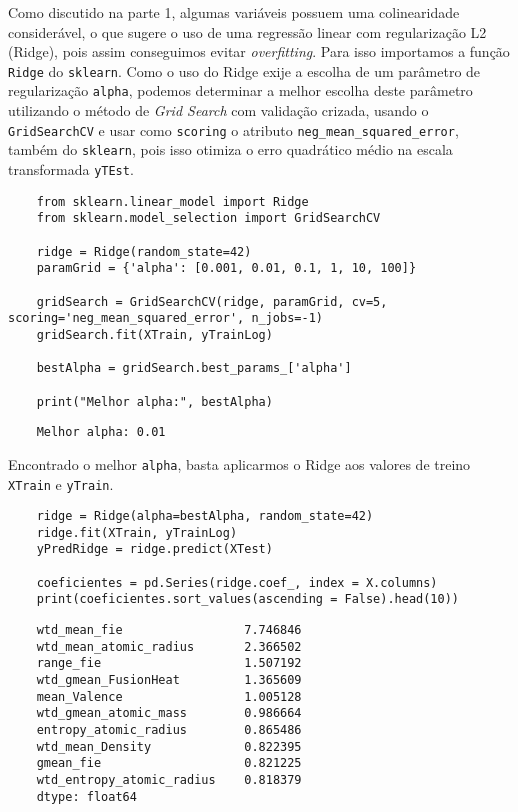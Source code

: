 Como discutido na parte 1, algumas variáveis possuem uma colinearidade considerável, o que sugere o uso de uma regressão linear com regularização L2 (Ridge), pois assim conseguimos evitar \textit{overfitting}. Para isso importamos a função \verb|Ridge| do \verb|sklearn|. Como o uso do Ridge exije a escolha de um parâmetro de regularização \verb|alpha|, podemos determinar a melhor escolha deste parâmetro utilizando o método de \textit{Grid Search} com validação crizada, usando o \verb|GridSearchCV| e usar como \verb|scoring| o atributo \verb|neg_mean_squared_error|, também do \verb|sklearn|, pois isso otimiza o erro quadrático médio na escala transformada \verb|yTEst|.
\begin{longlisting}
    \begin{verbatim}
    from sklearn.linear_model import Ridge
    from sklearn.model_selection import GridSearchCV

    ridge = Ridge(random_state=42)
    paramGrid = {'alpha': [0.001, 0.01, 0.1, 1, 10, 100]}

    gridSearch = GridSearchCV(ridge, paramGrid, cv=5, scoring='neg_mean_squared_error', n_jobs=-1)
    gridSearch.fit(XTrain, yTrainLog)

    bestAlpha = gridSearch.best_params_['alpha']

    print("Melhor alpha:", bestAlpha)
    \end{verbatim}
\end{longlisting}
\begin{verbatim}
    Melhor alpha: 0.01
\end{verbatim}

Encontrado o melhor \verb|alpha|, basta aplicarmos o Ridge aos valores de treino \verb|XTrain| e \verb|yTrain|.
\begin{longlisting}
    \begin{verbatim}
    ridge = Ridge(alpha=bestAlpha, random_state=42)
    ridge.fit(XTrain, yTrainLog)
    yPredRidge = ridge.predict(XTest)

    coeficientes = pd.Series(ridge.coef_, index = X.columns)
    print(coeficientes.sort_values(ascending = False).head(10))
    \end{verbatim}
\end{longlisting}
\begin{verbatim}
    wtd_mean_fie                 7.746846
    wtd_mean_atomic_radius       2.366502
    range_fie                    1.507192
    wtd_gmean_FusionHeat         1.365609
    mean_Valence                 1.005128
    wtd_gmean_atomic_mass        0.986664
    entropy_atomic_radius        0.865486
    wtd_mean_Density             0.822395
    gmean_fie                    0.821225
    wtd_entropy_atomic_radius    0.818379
    dtype: float64
\end{verbatim}

